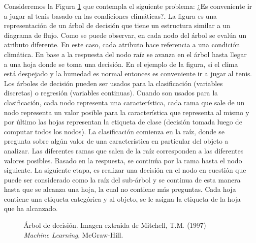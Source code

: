 	Consideremos la Figura \ref{fig: Arbol de decision} que contempla el siguiente problema: ¿Es conveniente ir a jugar al tenis basado en las condiciones climáticas?. La figura es una representación de un árbol de decisión que tiene un estructura similar a un diagrama de flujo. Como se puede observar, en cada nodo del árbol se evalúa un atributo diferente. En este caso, cada atributo hace referencia a una condición climática. En base a la respuesta del nodo raíz se avanza en el árbol hasta llegar a una hoja donde se toma una decisión. En el ejemplo de la figura, si el clima está despejado y la humedad es normal entonces es conveniente ir a jugar al tenis. Los árboles de decisión pueden ser usados para la clasificación (variables discretas) o regresión (variables continuas). Cuando son usados para la clasificación, cada nodo representa una característica, cada rama que sale de un nodo representa un valor posible para la característica que representa al mismo y por último las hojas representan la etiqueta de clase (decisión tomada luego de computar todos los nodos). La clasificación comienza en la raíz, donde se pregunta sobre algún valor de una característica en particular del objeto a analizar. Las diferentes ramas que salen de la  raíz corresponden a las diferentes valores posibles. Basado en la respuesta, se continúa por la rama hasta el nodo siguiente. La siguiente etapa, es realizar una decisión en el nodo en cuestión que puede ser considerado como la raíz del sub-árbol y se continua de esta manera hasta que se alcanza una hoja, la cual no contiene más preguntas. Cada hoja contiene una etiqueta categórica y al objeto, se le asigna la etiqueta de la hoja que ha alcanzado.
	
		\begin{figure}[htbp]
			\centering
			\caption{Árbol de decisión. Imagen extraida de Mitchell, T.M. (1997) \textit{Machine Learning}, McGraw-Hill.}
			\label{fig: Arbol de decision}
		\end{figure}
		
